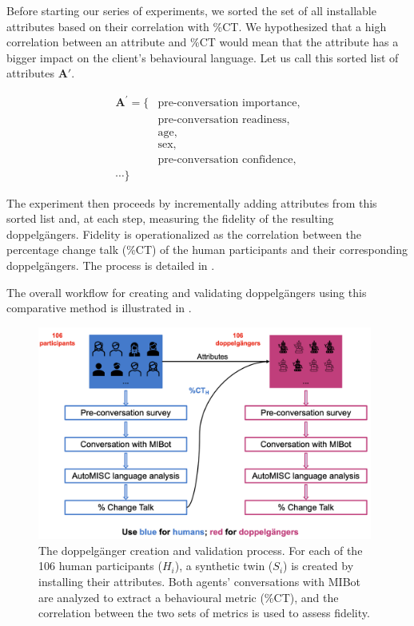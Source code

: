 Before starting our series of experiments, we sorted the set of all installable attributes based on their correlation with \%CT. We hypothesized that a high correlation between an attribute and \%CT would mean that the attribute has a bigger impact on the client's behavioural language. Let us call this sorted list of attributes $\mathbf{A'}$.

$$
\begin{aligned}
{\textbf{A}}^{'} = \{ & \text{pre-conversation importance,} \\
                     & \text{pre-conversation readiness,} \\
                     & \text{age,} \\
                     & \text{sex,} \\
                      & \text{pre-conversation confidence,} \\
                     \cdots \}
\end{aligned}
$$

The experiment then proceeds by incrementally adding attributes from this sorted list and, at each step, measuring the fidelity of the resulting doppelgängers. Fidelity is operationalized as the correlation between the percentage change talk (\%CT) of the human participants and their corresponding doppelgängers. The process is detailed in .


The overall workflow for creating and validating doppelgängers using this comparative method is illustrated in .

\begin{figure}[htpb]
    \centering
    \includegraphics[width=0.98\textwidth]{fig/doppelganger-study.png}
    \caption{The doppelgänger creation and validation process. For each of the 106 human participants ($H_i$), a synthetic twin ($S_i$) is created by installing their attributes. Both agents' conversations with MIBot are analyzed to extract a behavioural metric (\%CT), and the correlation between the two sets of metrics is used to assess fidelity.}
    \label{fig:doppelgänger-study}
\end{figure}


